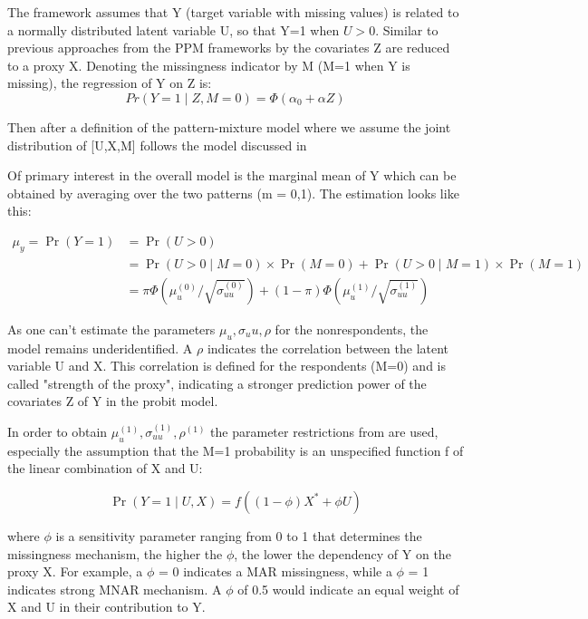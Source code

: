 \documentclass[11pt,a4paper]{article}
\begin{document}
The framework assumes that Y (target variable with missing values) is related to a normally distributed latent variable U, so that Y=1 when $U> 0$. Similar to previous approaches from the PPM frameworks by %
the covariates Z are reduced to a proxy X. Denoting the missingness indicator by M (M=1 when Y is missing), the regression of Y on Z is: 
$$ Pr\left( Y=1\mid Z, M=0\right) = \Phi \left(\alpha_0 + \alpha Z \right) $$

Then after a definition of the pattern-mixture model where we assume the joint distribution of [U,X,M] follows the model discussed in %

Of primary interest in the overall model is the marginal mean of Y which can be obtained by averaging over the two patterns (m = 0,1). The estimation looks like this: 

$$
\begin{aligned}
\mu_y=\operatorname{Pr}(Y=1) & =\operatorname{Pr}(U>0) \\
& =\operatorname{Pr}(U>0 \mid M=0) \times \operatorname{Pr}(M=0)+\operatorname{Pr}(U>0 \mid M=1) \times \operatorname{Pr}(M=1) \\
& =\pi \Phi\left(\mu_u^{(0)} / \sqrt{\sigma_{u u}^{(0)}}\right)+(1-\pi) \Phi\left(\mu_u^{(1)} / \sqrt{\sigma_{u u}^{(1)}}\right)
\end{aligned}
$$

As one can't estimate the parameters $\mu_u, \sigma_uu, \rho$ for the nonrespondents, the model remains underidentified. A $\rho$ indicates the correlation between the latent variable U and X. This correlation is defined for the respondents (M=0) and is called "strength of the proxy", indicating a stronger prediction power of the covariates Z of Y in the probit model. 

In order to obtain $\mu_u^{(1)}, \sigma_{u u}^{(1)}, \rho^{(1)}$ the parameter restrictions from %
are used, especially the assumption that the M=1 probability is an unspecified function f of the linear combination of X and U: 

$$\operatorname{Pr}(Y=1\mid U,X) = f\left(\left(1-\phi \right) X^{*} + \phi U \right)$$

where $\phi$ is a sensitivity parameter ranging from 0 to 1 that determines the missingness mechanism, the higher the $\phi$, the lower the dependency of Y on the proxy X. For example, a $\phi$ = 0 indicates a MAR missingness, while a $\phi$ = 1 indicates strong MNAR mechanism. A $\phi$ of 0.5 would indicate an equal weight of X and U in their contribution to Y. 
\end{document}
